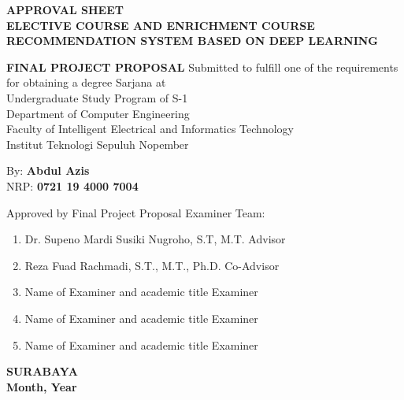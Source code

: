 \begin{center}
    \uppercase{\textbf{\large Approval Sheet}} \\

    \vspace*{10mm}
    \uppercase{\textbf{Elective Course and Enrichment course recommendation system based on Deep Learning}}
    \vspace*{10mm}

    {
        \uppercase{\textbf{Final Project Proposal}}
        Submitted to fulfill one of the requirements                  \\
        for obtaining a degree Sarjana at                             \\
        Undergraduate Study Program of S-1                            \\
        Department of Computer Engineering                            \\
        Faculty of Intelligent Electrical and Informatics Technology  \\
        Institut Teknologi Sepuluh Nopember                           \\
    }

    \vspace*{1.5cm}
    By: \textbf{Abdul Azis}                                       \\
    \vspace*{3mm}
    NRP: \textbf{0721 19 4000 7004}                               \\
    \vspace*{1.5cm}

    Approved by Final Project Proposal Examiner Team:             \\
    \vspace*{5mm}

    \begin{enumerate}
        \setlength\itemsep{1.5em}
        \item Dr. Supeno Mardi Susiki Nugroho, S.T, M.T. \hfill Advisor
        \item Reza Fuad Rachmadi, S.T., M.T., Ph.D. \hfill Co-Advisor
        \item Name of Examiner and academic title \hfill Examiner
        \item Name of Examiner and academic title \hfill Examiner
        \item Name of Examiner and academic title \hfill Examiner
    \end{enumerate}

    \vspace*{1.5cm}
    \uppercase{\textbf{surabaya}}                      \\
    \textbf{Month, Year}                               \\

\end{center}